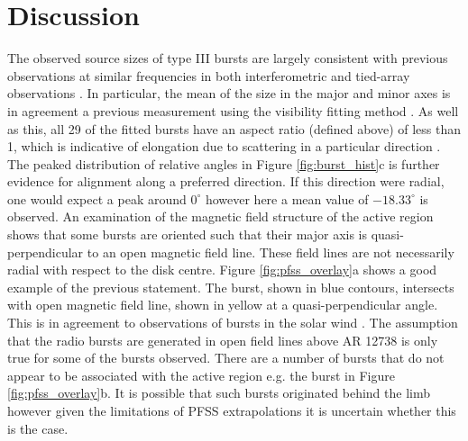 
\section{Discussion}
\label{sec:obsvtheory_discussion}
The observed source sizes of type III bursts are largely consistent with previous observations at similar frequencies in both interferometric and tied-array observations \citep{Kontar2017, Zhang2020}. In particular, the mean of the size in the major and minor axes is in agreement a previous measurement using the visibility fitting method \citep{Murphy2021}. As well as this, all 29 of the fitted bursts have an aspect ratio (defined above) of less than 1, which is indicative of elongation due to scattering in a particular direction \citep{Anantharamaiah1994, Bastian1994}. The peaked distribution of relative angles in Figure \ref{fig:burst_hist}c is further evidence for alignment along a preferred direction. If this direction were radial, one would expect a peak around $0^\circ$ however here a mean value of $-18.33^\circ$ is observed. An examination of the magnetic field structure of the active region shows that some bursts are oriented such that their major axis is quasi-perpendicular to an open magnetic field line. These field lines are not necessarily radial with respect to the disk centre. Figure \ref{fig:pfss_overlay}a shows a good example of the previous statement. The burst, shown in blue contours, intersects with open magnetic field line, shown in yellow at a quasi-perpendicular angle. This is in agreement to observations of bursts in the solar wind \citep{Anantharamaiah1994, SasikumarRaja2016}. The assumption that the radio bursts are generated in open field lines above AR 12738 is only true for some of the bursts observed. There are a number of bursts that do not appear to be associated with the active region e.g. the burst in Figure \ref{fig:pfss_overlay}b. It is possible that such bursts originated behind the limb however given the limitations of PFSS extrapolations it is uncertain whether this is the case. %

